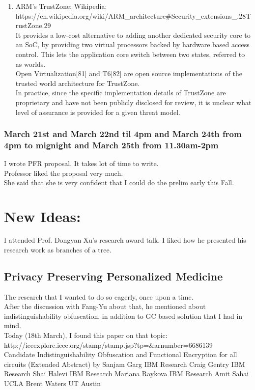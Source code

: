 \documentclass[11pt]{article}
\begin{document}
\begin{enumerate}
\item ARM's TrustZone: Wikipedia: https://en.wikipedia.org/wiki/ARM\_architecture\#Security\_extensions\_.28TrustZone.29\\
It provides a low-cost alternative to adding another dedicated security core to an SoC, by providing two virtual processors backed by hardware based 
access control. This lets the application core switch between two states, referred to as worlds.\\
Open Virtualization[81] and T6[82] are open source implementations of the trusted world architecture for TrustZone.\\
In practice, since the specific implementation details of TrustZone are proprietary and have not been publicly disclosed for review, it is unclear 
what level of assurance is provided for a given threat model.

\end{enumerate}

\subsubsection*{March 21st and March 22nd til 4pm and March 24th from 4pm to mignight and March 25th from 11.30am-2pm}
I wrote PFR proposal. It takes lot of time to write.\\

Professor liked the proposal very much.\\

She said that she is very confident that I could do the prelim early this Fall.
\pagebreak

\section*{New Ideas:}

I attended Prof. Dongyan Xu's research award talk. I liked how he presented his research work as branches of a tree.

\subsection{Privacy Preserving Personalized Medicine}
The research that I wanted to do so eagerly, once upon a time. \\
After the discussion with Fang-Yu about that, he mentioned about indistinguishability obfuscation, in addition to GC based solution that I had in 
mind.\\
Today (18th March), I found this paper on that topic: http://ieeexplore.ieee.org/stamp/stamp.jsp?tp=\&arnumber=6686139\\
Candidate Indistinguishability Obfuscation and Functional Encryption for all circuits
(Extended Abstract) by Sanjam Garg IBM Research Craig Gentry IBM Research Shai Halevi IBM Research Mariana Raykova IBM Research Amit Sahai UCLA Brent 
Waters UT Austin
\end{document}
